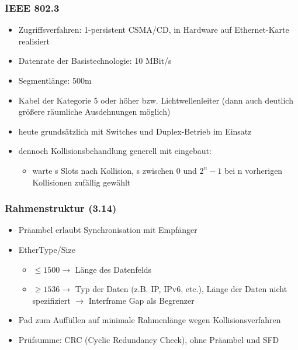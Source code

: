 \subsubsection{IEEE 802.3}
\begin{itemize}
	\item Zugriffsverfahren: 1-persistent CSMA/CD, in Hardware auf Ethernet-Karte realisiert
	\item Datenrate der Basistechnologie: 10 MBit/s
	\item Segmentlänge: 500m
	\item Kabel der Kategorie 5 oder höher bzw. Lichtwellenleiter (dann auch deutlich größere räumliche Ausdehnungen möglich)
	\item heute grundsätzlich mit Switches und Duplex-Betrieb im Einsatz
	\item dennoch Kollisionsbehandlung generell mit eingebaut:
	\begin{itemize}
		\item warte s Slots nach Kollision, s zwischen 0 und \(2^n-1\) bei n vorherigen Kollisionen zufällig gewählt
	\end{itemize}
\end{itemize}
\subsubsection{Rahmenstruktur (3.14)}
\begin{itemize}
	\item Präambel erlaubt Synchronisation mit Empfänger
	\item EtherType/Size
	\begin{itemize}
		\item \(\le 1500 \to \) Länge des Datenfelds
		\item \(\ge 1536 \to \) Typ der Daten (z.B. IP, IPv6, etc.), Länge der Daten nicht spezifiziert \(\to\) Interframe Gap als Begrenzer
	\end{itemize}
	\item Pad zum Auffüllen auf minimale Rahmenlänge wegen Kollisionsverfahren
	\item Prüfsumme: CRC (Cyclic Redundancy Check), ohne Präambel und SFD
\end{itemize}

